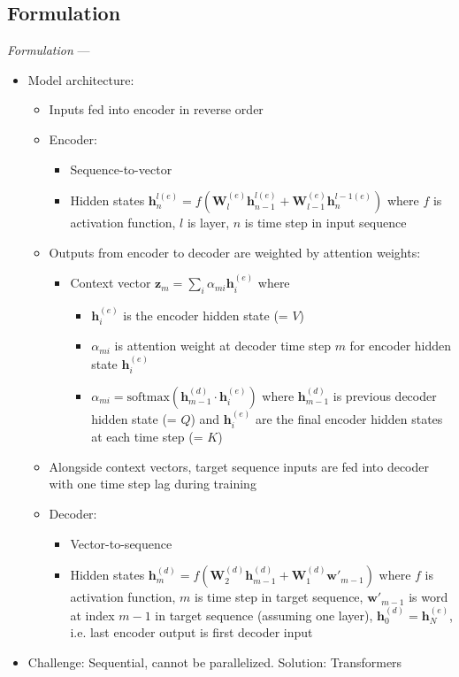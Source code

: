 \subsection*{Formulation}
\emph{Formulation} --- 
\begin{itemize}
    \item Model architecture: 
    \begin{itemize}
        \item Inputs fed into encoder in reverse order
        \item Encoder: 
        \begin{itemize}
            \item Sequence-to-vector
            \item Hidden states $\boldsymbol{h}_n^{l (e)} = f ( \boldsymbol{W}_l^{(e)} \boldsymbol{h}_{n-1}^{l(e)} + \boldsymbol{W}_{l-1}^{(e)} \boldsymbol{h}_{n}^{l-1(e)} )$ where $f$ is activation function, $l$ is layer, $n$ is time step in input sequence
        \end{itemize}
        \item Outputs from encoder to decoder are weighted by attention weights:
        \begin{itemize}
            \item Context vector $\boldsymbol{z}_m = \sum_i \alpha_{mi} \boldsymbol{h}_i^{(e)}$ where 
            \begin{itemize}
                \item $\boldsymbol{h}_i^{(e)}$ is the encoder hidden state (= $V$)
                \item $\alpha_{mi}$ is attention weight at decoder time step $m$ for encoder hidden state $\boldsymbol{h}_i^{(e)}$ 
                \item $\alpha_{mi} = \textrm{softmax}(\boldsymbol{h}_{m-1}^{(d)} \cdot \boldsymbol{h}_i^{(e)})$ where $\boldsymbol{h}_{m-1}^{(d)}$ is previous decoder hidden state (= $Q$) and $\boldsymbol{h}_i^{(e)}$ are the final encoder hidden states at each time step (= $K$)
            \end{itemize}
        \end{itemize}
        \item Alongside context vectors, target sequence inputs are fed into decoder with one time step lag during training
        \item Decoder: 
        \begin{itemize}
            \item Vector-to-sequence
            \item Hidden states $\boldsymbol{h}_m^{(d)} = f ( \boldsymbol{W}_2^{(d)} \boldsymbol{h}_{m-1}^{(d)} + \boldsymbol{W}_1^{(d)} \boldsymbol{w'}_{m-1} )$ where $f$ is activation function, $m$ is time step in target sequence, $\boldsymbol{w'}_{m-1}$ is word at index $m-1$ in target sequence (assuming one layer), $\boldsymbol{h}_0^{(d)} = \boldsymbol{h}_N^{(e)}$, i.e. last encoder output is first decoder input
        \end{itemize}
    \end{itemize}
    \item Challenge: Sequential, cannot be parallelized. Solution: Transformers
\end{itemize}


